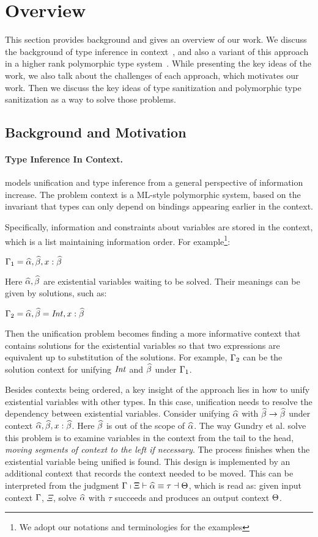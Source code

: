 \section{Overview}
\label{sec:overview}

This section provides background and gives an overview of our work. We discuss
the background of type inference in context~\citep{gundry2010type}, and also a
variant of this approach in a higher rank polymorphic type
system~\citep{dunfield2013complete}. While presenting the key ideas of the work,
we also talk about the challenges of each approach, which motivates our work.
Then we discuss the key ideas of type sanitization and polymorphic type
sanitization as a way to solve those problems.

\subsection{Background and Motivation}

\paragraph{Type Inference In Context.}
\citet{gundry2010type} models unification and type inference from a general
perspective of information increase. The problem context is a ML-style
polymorphic system, based on the invariant that types can only depend on
bindings appearing earlier in the context.

Specifically, information and constraints about variables are stored in the
context, which is a list maintaining information order. For example\footnote{We
  adopt our notations and terminologies for the examples}:

$\Gamma_1 = \widehat{\alpha}, \widehat{\beta}, x :\widehat{\beta}$

Here $\widehat{\alpha}, \widehat{\beta}$ are existential variables waiting to be solved. Their
meanings can be given by solutions, such as:

$\Gamma_2 = \widehat{\alpha}, \widehat{\beta} = \mathit{Int}, x :\widehat{\beta}$

Then the unification problem becomes finding a more informative context that
contains solutions for the existential variables so that two expressions are
equivalent up to substitution of the solutions. For
example, $\Gamma_2$ can be the solution context for unifying
$\mathit{Int}$ and $\widehat{\beta}$ under $\Gamma_1$.

Besides contexts being ordered, a key insight of the approach lies in how to
unify existential variables with other types. In this case, unification needs to
resolve the dependency between existential variables. Consider unifying $\widehat{\alpha}$
with $\widehat{\beta} \to \widehat{\beta}$ under context $\widehat{\alpha}, \widehat{\beta}, x : \widehat{\beta}$. Here $\widehat{\beta}$ is
out of the scope of $\widehat{\alpha}$. The way Gundry et al. solve this problem is to examine variables in
the context from the tail to the head, \textit{moving segments of context to the
  left if necessary}. The process finishes when the existential variable being unified is found.
This design is implemented by an additional context that records the context
needed to be moved. This can be interpreted from the judgment $\Gamma \shortmid
\Xi \vdash \widehat{\alpha} \equiv \tau \dashv \Theta$, which is read as: given input context
$\Gamma$, $\Xi$, solve $\widehat{\alpha}$ with $\tau$ succeeds and produces an output
context $\Theta$.

